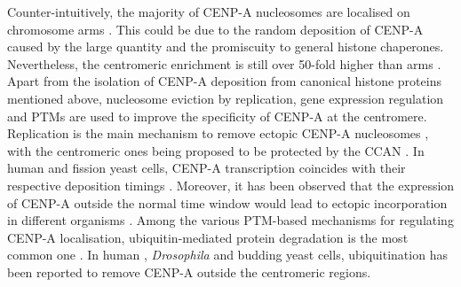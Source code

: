 Counter-intuitively, the majority of CENP-A nucleosomes are localised on chromosome arms \citep{Bodor2014}. This could be due to the random deposition of CENP-A caused by the large quantity and the promiscuity to general histone chaperones. Nevertheless, the centromeric enrichment is still over 50-fold higher than arms \citep{Bodor2014}. Apart from the isolation of CENP-A deposition from canonical histone proteins mentioned above, nucleosome eviction by replication, gene expression regulation and PTMs are used to improve the specificity of CENP-A at the centromere. Replication is the main mechanism to remove ectopic CENP-A nucleosomes \citep{Nechemia-Arbely2019, Wang2021PhosphorylationCycle}, with the centromeric ones being proposed to be protected by the CCAN \citep{Nechemia-Arbely2019}. In human and fission yeast cells, CENP-A transcription coincides with their respective deposition timings \citep{Shelby1997AssemblySites, Takahashi2000RequirementYeast, Aristizabal-Corrales2019CellFormation}. Moreover, it has been observed that the expression of CENP-A outside the normal time window would lead to ectopic incorporation in different organisms \citep{Aristizabal-Corrales2019CellFormation, Heun2006, Tomonaga2005CentromereAneuploidy, Au2008AlteredCerevisiae, Olszak2011, McGovern2012CentromereCancer, Athwal2015CENP-ACells, Shrestha2021, Moreno-Moreno2019TheCycle}. Among the various  PTM-based mechanisms for regulating CENP-A localisation, ubiquitin-mediated protein degradation is the most common one \citep{Stirpe2022}. In human \citep{Maehara2010CENP-AMitoses, Lomonte2001DegradationICP0}, \textit{Drosophila} \citep{Moreno-Moreno2019TheCycle, Bade2014TheManner} and budding yeast \citep{Ranjitkar2010AnDomain, Au2013AProteolysis, Mishra2015Pat1Ubiquitination, Zhou2021MolecularPsh1} cells, ubiquitination has been reported to remove CENP-A outside the centromeric regions. 

